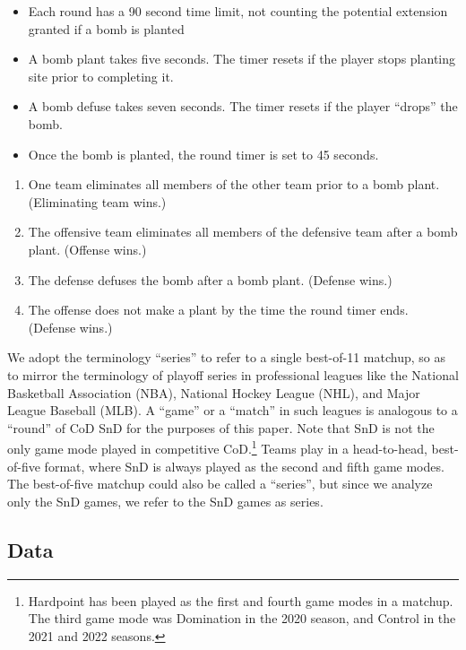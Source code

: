 \documentclass{article}
\providecommand{\tightlist}{%
  \setlength{\itemsep}{0pt}\setlength{\parskip}{0pt}}
\begin{document}
\begin{itemize}
\tightlist
\item
  Each round has a 90 second time limit, not counting the potential
  extension granted if a bomb is planted
\item
  A bomb plant takes five seconds. The timer resets if the player stops
  planting site prior to completing it.
\item
  A bomb defuse takes seven seconds. The timer resets if the player
  ``drops'' the bomb.
\item
  Once the bomb is planted, the round timer is set to 45 seconds.
\end{itemize}

\begin{enumerate}
\def\labelenumi{\arabic{enumi}.}
\tightlist
\item
  One team eliminates all members of the other team prior to a bomb
  plant. (Eliminating team wins.)
\item
  The offensive team eliminates all members of the defensive team after
  a bomb plant. (Offense wins.)
\item
  The defense defuses the bomb after a bomb plant. (Defense wins.)
\item
  The offense does not make a plant by the time the round timer ends.
  (Defense wins.)
\end{enumerate}

We adopt the terminology ``series'' to refer to a single best-of-11
matchup, so as to mirror the terminology of playoff series in
professional leagues like the National Basketball Association (NBA),
National Hockey League (NHL), and Major League Baseball (MLB). A
``game'' or a ``match'' in such leagues is analogous to a ``round'' of
CoD SnD for the purposes of this paper. Note that SnD is not the only
game mode played in competitive CoD.\footnote{Hardpoint has been played
  as the first and fourth game modes in a matchup. The third game mode
  was Domination in the 2020 season, and Control in the 2021 and 2022
  seasons.} Teams play in a head-to-head, best-of-five format, where SnD
is always played as the second and fifth game modes. The best-of-five
matchup could also be called a ``series'', but since we analyze only the
SnD games, we refer to the SnD games as series.

\hypertarget{data}{%
\subsection{Data}\label{data}}
\end{document}
